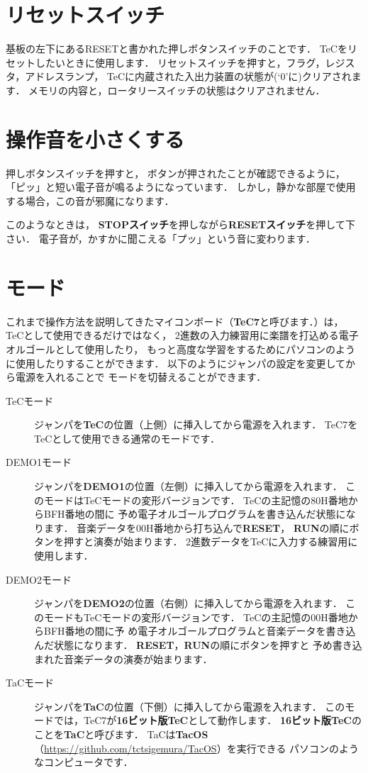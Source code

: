 \section{リセットスイッチ}
基板の左下にあるRESETと書かれた押しボタンスイッチのことです．
TeCをリセットしたいときに使用します．
リセットスイッチを押すと，フラグ，レジスタ，アドレスランプ，
TeCに内蔵された入出力装置の状態が(`0'に)クリアされます．
メモリの内容と，ロータリースイッチの状態はクリアされません．

\section{操作音を小さくする}
押しボタンスイッチを押すと，
ボタンが押されたことが確認できるように，
「ピッ」と短い電子音が鳴るようになっています．
しかし，静かな部屋で使用する場合，この音が邪魔になります．

このようなときは，
{\bf STOPスイッチ}を押しながら{\bf RESETスイッチ}を押して下さい．
電子音が，かすかに聞こえる「プッ」という音に変わります．

\section{モード}
これまで操作方法を説明してきたマイコンボード（{\bf TeC7}と呼びます．）は，
TeCとして使用できるだけではなく，
2進数の入力練習用に楽譜を打込める電子オルゴールとして使用したり，
もっと高度な学習をするためにパソコンのように使用したりすることができます．
以下のようにジャンパの設定を変更してから電源を入れることで
モードを切替えることができます．


\begin{description}
\item[TeCモード]
ジャンパを{\bf TeC}の位置（上側）に挿入してから電源を入れます．
TeC7をTeCとして使用できる通常のモードです．

\item[DEMO1モード]
ジャンパを{\bf DEMO1}の位置（左側）に挿入してから電源を入れます．
このモードはTeCモードの変形バージョンです．
TeCの主記憶の80H番地からBFH番地の間に
予め電子オルゴールプログラムを書き込んだ状態になります．
音楽データを00H番地から打ち込んで{\bf RESET}，
{\bf RUN}の順にボタンを押すと演奏が始まります．
2進数データをTeCに入力する練習用に使用します．

\item[DEMO2モード]
ジャンパを{\bf DEMO2}の位置（右側）に挿入してから電源を入れます．
このモードもTeCモードの変形バージョンです．
TeCの主記憶の00H番地からBFH番地の間に予
め電子オルゴールプログラムと音楽データを書き込んだ状態になります．
{\bf RESET}，{\bf RUN}の順にボタンを押すと
予め書き込まれた音楽データの演奏が始まります．

\item[TaCモード]
ジャンパを{\bf TaC}の位置（下側）に挿入してから電源を入れます．
このモードでは，TeC7が{\bf 16ビット版TeC}として動作します．
{\bf 16ビット版TeC}のことを{\bf TaC}と呼びます．
TaCは{\bf TacOS}（\url{https://github.com/tctsigemura/TacOS}）を実行できる
パソコンのようなコンピュータです．
\end{description}

